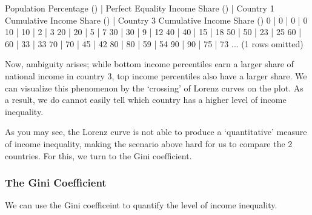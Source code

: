 \documentclass[letterpaper,10pt,english]{jupyterBook}
\begin{document}
\begin{sphinxVerbatim}[commandchars=\\\{\}]
Population Percentage (\PYGZpc{}) | Perfect Equality Income Share (\PYGZpc{}) | Country 1 Cumulative Income Share (\PYGZpc{}) | Country 3 Cumulative Income Share (\PYGZpc{})
0                         | 0                                 | 0                                     | 0
10                        | 10                                | 2                                     | 3
20                        | 20                                | 5                                     | 7
30                        | 30                                | 9                                     | 12
40                        | 40                                | 15                                    | 18
50                        | 50                                | 23                                    | 25
60                        | 60                                | 33                                    | 33
70                        | 70                                | 45                                    | 42
80                        | 80                                | 59                                    | 54
90                        | 90                                | 75                                    | 73
... (1 rows omitted)
\end{sphinxVerbatim}

\noindent{}

\sphinxAtStartPar
Now, ambiguity arises; while bottom income percentiles earn a larger share of national income in country 3, top income percentiles also have a larger share. We can visualize this phenomenon by the ‘crossing’ of Lorenz curves on the plot. As a result, we do cannot easily tell which country has a higher level of income inequality.

\sphinxAtStartPar
As you may see, the Lorenz curve is not able to produce a ‘quantitative’ measure of income inequality, making the scenario above hard for us to compare the 2 countries. For this, we turn to the Gini coefficient.


\subsubsection{The Gini Coefficient}
\label{\detokenize{content/06-inequality/inequality:the-gini-coefficient}}
\sphinxAtStartPar
We can use the Gini coefficeint to quantify the level of income inequality.
\end{document}
